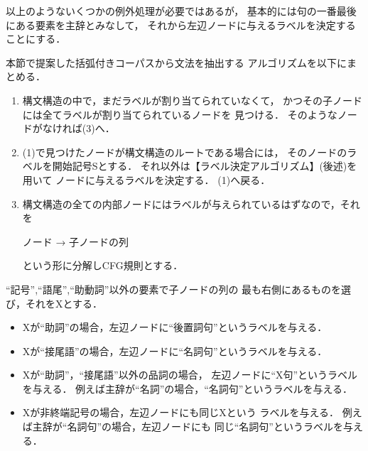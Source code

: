 以上のようないくつかの例外処理が必要ではあるが，
基本的には句の一番最後にある要素を主辞とみなして，
それから左辺ノードに与えるラベルを決定することにする．

本節で提案した括弧付きコーパスから文法を抽出する
アルゴリズムを以下にまとめる．

\begin{flushleft}
  \vspace*{2mm}{\bf 【文法抽出アルゴリズム】}\vspace*{-3mm}
\end{flushleft}

\begin{enumerate}
\item
  構文構造の中で，まだラベルが割り当てられていなくて，
  かつその子ノードには全てラベルが割り当てられているノードを
  見つける．
  そのようなノードがなければ(3)へ．

\item
  (1)で見つけたノードが構文構造のルートである場合には，
  そのノードのラベルを開始記号Sとする．
  それ以外は【ラベル決定アルゴリズム】(後述)を用いて
  ノードに与えるラベルを決定する．
  (1)へ戻る．

\item
  構文構造の全ての内部ノードにはラベルが与えられているはずなので，それを
  \begin{center}
    ノード \quad → \quad 子ノードの列
  \end{center}
  という形に分解しCFG規則とする．
\end{enumerate}

\begin{flushleft}
  \vspace*{2mm}{\bf 【ラベル決定アルゴリズム】}\vspace*{-3mm}
\end{flushleft}

``記号'',``語尾'',``助動詞''以外の要素で子ノードの列の
最も右側にあるものを選び，それをXとする．
\begin{itemize}
\item
  Xが``助詞''の場合，左辺ノードに``後置詞句''というラベルを与える．

\item
  Xが``接尾語''の場合，左辺ノードに``名詞句''というラベルを与える．

\item
  Xが``助詞''，``接尾語''以外の品詞の場合，
  左辺ノードに``X句''というラベルを与える．
  例えば主辞が``名詞''の場合，``名詞句''というラベルを与える．

\item
  Xが非終端記号の場合，左辺ノードにも同じXという
  ラベルを与える．
  例えば主辞が``名詞句''の場合，左辺ノードにも
  同じ``名詞句''というラベルを与える．
\end{itemize}

